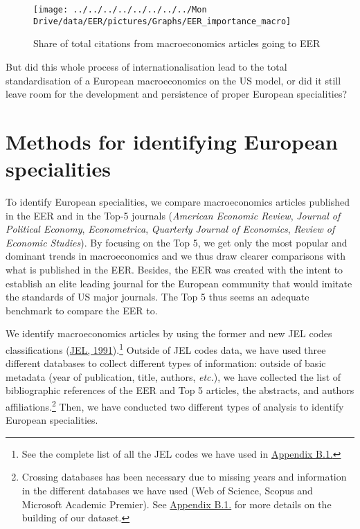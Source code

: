 \documentclass[
]{article}
\begin{document}
\begin{figure}[h]

{\centering \texttt{[image: ../../../../../../../../Mon Drive/data/EER/pictures/Graphs/EER\_importance\_macro]} 

}

\caption{Share of total citations from macroeconomics articles going to EER}\label{fig:plot-eer-importance-macro}
\end{figure}

But did this whole process of internationalisation lead to the total
standardisation of a European macroeconomics on the US model, or did it
still leave room for the development and persistence of proper European
specialities?

\hypertarget{methods}{%
\section{Methods for identifying European specialities}\label{methods}}

To identify European specialities, we compare macroeconomics articles
published in the EER and in the Top-5 journals (\emph{American Economic
Review}, \emph{Journal of Political Economy}, \emph{Econometrica},
\emph{Quarterly Journal of Economics}, \emph{Review of Economic
Studies}). By focusing on the Top 5, we get only the most popular and
dominant trends in macroeconomics and we thus draw clearer comparisons
with what is published in the EER. Besides, the EER was created with the
intent to establish an elite leading journal for the European community
that would imitate the standards of US major journals. The Top 5 thus
seems an adequate benchmark to compare the EER to.

We identify macroeconomics articles by using the former and new JEL
codes classifications (\protect\hyperlink{ref-jel1991}{JEL,
1991}).\footnote{See the complete list of all the JEL codes we have used
  in \protect\hyperlink{eer-top5-macro}{Appendix B.1.}} Outside of JEL
codes data, we have used three different databases to collect different
types of information: outside of basic metadata (year of publication,
title, authors, \emph{etc.}), we have collected the list of
bibliographic references of the EER and Top 5 articles, the abstracts,
and authors affiliations.\footnote{Crossing databases has been necessary
  due to missing years and information in the different databases we
  have used (Web of Science, Scopus and Microsoft Academic Premier). See
  \protect\hyperlink{corpus}{Appendix B.1.} for more details on the
  building of our dataset.} Then, we have conducted two different types
of analysis to identify European specialities.
\end{document}
